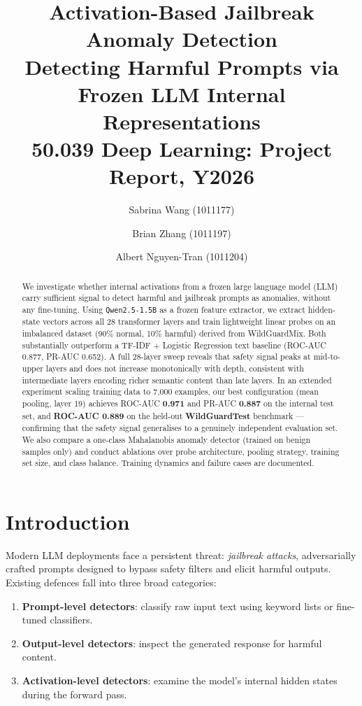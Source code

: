 \documentclass[11pt,a4paper]{article}
\title{
  \vspace{-1em}
  \LARGE\textbf{Activation-Based Jailbreak Anomaly Detection} \\[0.4em]
  \large Detecting Harmful Prompts via Frozen LLM Internal Representations \\[0.4em]
  \normalsize 50.039 Deep Learning: Project Report, Y2026
}
\author{%
  Sabrina Wang (1011177) \and
  Brian Zhang (1011197) \and
  Albert Nguyen-Tran (1011204)}
\date{}
\begin{document}
\maketitle
\thispagestyle{fancy}

\begin{abstract}
We investigate whether internal activations from a frozen large language model (LLM)
carry sufficient signal to detect harmful and jailbreak prompts as anomalies, without
any fine-tuning. Using \texttt{Qwen2.5-1.5B} as a frozen feature extractor, we extract
hidden-state vectors across all 28 transformer layers and train lightweight linear probes
on an imbalanced dataset (90\% normal, 10\% harmful) derived from WildGuardMix.
Both substantially outperform a TF-IDF + Logistic Regression text baseline (ROC-AUC 0.877,
PR-AUC 0.652). A full 28-layer sweep reveals that safety signal peaks at mid-to-upper layers
and does not increase monotonically with depth,
consistent with intermediate layers encoding richer semantic content than late layers.
In an extended experiment scaling training data to 7{,}000 examples, our best configuration
(mean pooling, layer 19) achieves ROC-AUC \textbf{0.971} and PR-AUC \textbf{0.887} on the
internal test set, and \textbf{ROC-AUC 0.889} on the held-out \textbf{WildGuardTest}
benchmark --- confirming that the safety signal generalises to a genuinely independent
evaluation set.
We also compare a one-class Mahalanobis anomaly detector (trained on benign samples only)
and conduct ablations over probe architecture, pooling strategy, training set size, and
class balance. Training dynamics and failure cases are documented.
\end{abstract}

\tableofcontents
\newpage

\section{Introduction}

Modern LLM deployments face a persistent threat: \emph{jailbreak attacks}, adversarially
crafted prompts designed to bypass safety filters and elicit harmful outputs. Existing
defences fall into three broad categories:

\begin{enumerate}[noitemsep]
  \item \textbf{Prompt-level detectors}: classify raw input text using keyword lists
        or fine-tuned classifiers.
  \item \textbf{Output-level detectors}: inspect the generated response for harmful content.
  \item \textbf{Activation-level detectors}: examine the model's internal hidden states
        during the forward pass.
\end{enumerate}
\end{document}
